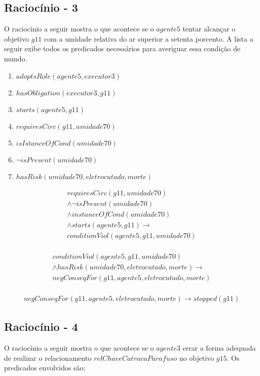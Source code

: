 \subsection{Raciocínio - 3} 
\label{raciocinio3}

O raciocínio a seguir mostra o que acontece se o $agente5$ tentar alcançar o objetivo $g11$ com a umidade relativa do ar superior a setenta porcento. A lista a seguir exibe todos os predicados necessários para averiguar essa condição de mundo. 

\begin{enumerate}
	\item $adoptsRole(agente5,executor3)$
	\item $hasObligation(executor3,g11)$	
	\item $starts(agente5,g11)$ 
	\item $requiresCirc(g11,umidade70)$
	\item $isIstanceOfCond(umidade70)$
	\item $\neg isPresent(umidade70)$
	\item $hasRisk(umidade70,eletrocutado,morte)$
\end{enumerate}

\begin{eqnarray}
	requiresCirc(g11,umidade70) \\ \nonumber
	\wedge \neg isPresent(umidade70) \\ \nonumber
	\wedge instanceOfCond(umidade70) \\ \nonumber
	\wedge starts(agente5,g11)  \to \\ \nonumber   
	conditionViol(agente5,g11,umidade70) \nonumber \\	
\end{eqnarray}

\begin{eqnarray} \nonumber
	conditionViol(agente5,g11,umidade70) \nonumber \\
	 \wedge hasRisk(umidade70,eletrocutado,morte) \to \nonumber \\ 
	negConseqFor(g11,agente5,eletrocutado,morte) \nonumber \\ 	
\end{eqnarray}

\begin{eqnarray}
	negConseqFor(g11,agente5,eletrocutado,morte) \to stopped(g11)
\end{eqnarray}

\subsection{Raciocínio - 4} 
\label{raciocinio4}
O raciocínio a seguir mostra o que acontece se o $agente3$ errar a forma adequada de realizar o relacionamento $relChaveCatracaParafuso$ no objetivo $g15$. Os predicados envolvidos são;

